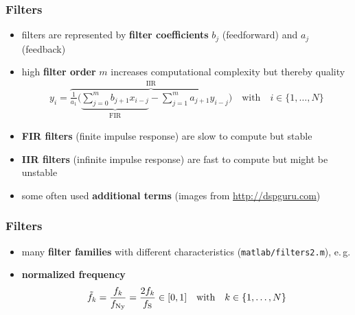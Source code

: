 \begin{frame} %
	\frametitle{Filters}
	\begin{itemize}
		\item filters are represented by \textbf{filter coefficients} $b_j$ (feedforward) and $a_j$ (feedback)
		\item high \textbf{filter order} $m$ increases computational complexity but thereby quality
			\begin{align*}
				y_i=\overbrace{\frac1{a_1}\Bigg(\underbrace{\sum_{j=0}^mb_{j+1}x_{i-j}}_{\textrm{FIR}}-\sum_{j=1}^ma_{j+1}y_{i-j}\Bigg)}^{\textrm{IIR}}\quad\textrm{with}\quad i\in\{1,\ldots,N\}
			\end{align*}
		\item \textbf{FIR filters} (finite impulse response) are slow to compute but stable
		\item \textbf{IIR filters} (infinite impulse response) are fast to compute but might be unstable
		\item some often used \textbf{additional terms} (images from \url{http://dspguru.com})
			\begin{figure}
				\centering
				\begin{subfigure}[c]{0.48\linewidth}
				\end{subfigure}
				\hspace{0.01\linewidth}
				\begin{subfigure}[c]{0.48\linewidth}
				\end{subfigure}
			\end{figure}
	\end{itemize}
\end{frame}

\begin{frame} %
	\frametitle{Filters}
	\begin{itemize}
		\item many \textbf{filter families} with different characteristics (\texttt{matlab/filters2.m}), e.\,g.
			\begin{figure}
				\centering
				\begin{subfigure}[c]{0.8\linewidth}
				\end{subfigure}
			\end{figure}
		\item \textbf{normalized frequency}
			\begin{align*}
				\tilde f_k=\frac{f_k}{f_{\textrm{Ny}}}=\frac{2f_k}{f_{\textrm S}}\in[0,1]\quad\textrm{with}\quad k\in\{1,\ldots,N\}
			\end{align*}
	\end{itemize}
\end{frame}

